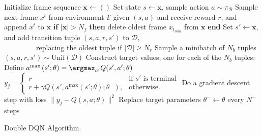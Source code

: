 \begin{algorithm2e}[h!]
\small
{}
 {
  Initialize frame sequence $\mathbf{x} \leftarrow ()$ \;
   {
    Set state $s \leftarrow \mathbf{x}$, sample action $a \sim \pi_\mathcal{B}$ \;
    Sample next frame $x^t$ from environment $\mathcal{E}$ given $(s,a)$ and receive reward $r$, and append $x^t$ to $\mathbf{x}$ \;
    {\bf if} {$|\mathbf{x}| > N_f$} {\bf then} delete oldest frame $x_{t_{min}}$ from $\mathbf{x}$ {\bf end} \;
    Set $s' \leftarrow \mathbf{x}$, and add transition tuple $(s, a, r, s')$ to $\mathcal{D}$,\\~~~~~~~~~replacing the oldest tuple if $|\mathcal{D}| \ge N_r$ \;
    Sample a minibatch of $N_b$ tuples $(s, a, r, s') \sim \mbox{Unif}(\mathcal{D})$\; %
    Construct target values, one for each of the $N_b$ tuples: \;
    Define $a^{\max{}}(s'; \theta) = \argmax_{a'} Q(s', a'; \theta)$\;
    $y_j = \left\{ \begin{array}{ll}
         r & \mbox{if $s'$ is terminal}\\
         r + \gamma Q(s', a^{\max{}}(s'; \theta); \theta^-), & \mbox{otherwise}. \end{array} \right.$ \;
    Do a gradient descent step with loss $\|y_j - Q(s, a ; \theta )\|^2$ \;
    Replace target parameters $\theta^- \leftarrow \theta$ every $N^-$ steps\;
  }
}
\caption{Double DQN Algorithm.}\label{alg:ddqn}
\end{algorithm2e}
